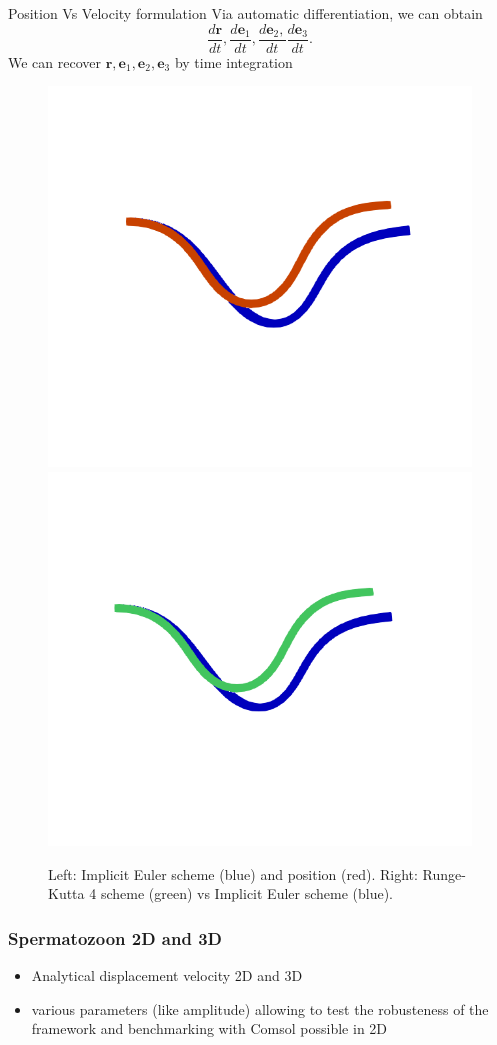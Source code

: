 \documentclass{beamer}
\begin{document}
\begin{frame}{Position Vs Velocity formulation}
	Via automatic differentiation, we can obtain \[\frac{d\textbf{r}}{dt}, \frac{d\textbf{e}_1}{dt},\frac{d\textbf{e}_2,}{dt}\frac{d \textbf{e}_3}{dt}.\] 
	We can recover $\textbf{r},\textbf{e}_1,\textbf{e}_2,\textbf{e}_3$ by time integration
\begin{figure}
	\caption[caption]{ Left: Implicit Euler scheme (blue) and position (red).
		Right: Runge-Kutta 4 scheme (green) vs Implicit Euler scheme (blue).}
	\includegraphics[width=0.45\linewidth]{figures/gait-5.png}
	\includegraphics[width=0.45\linewidth]{figures/gait-4.png}
\end{figure}
\end{frame}
\begin{frame}
	\frametitle{Spermatozoon 2D and 3D}

	\begin{itemize}
		\item Analytical displacement velocity 2D and 3D
		\item various parameters (like amplitude) allowing to test the robusteness of the framework and benchmarking with Comsol possible in 2D
	\end{itemize}

\end{frame}
\end{document}
